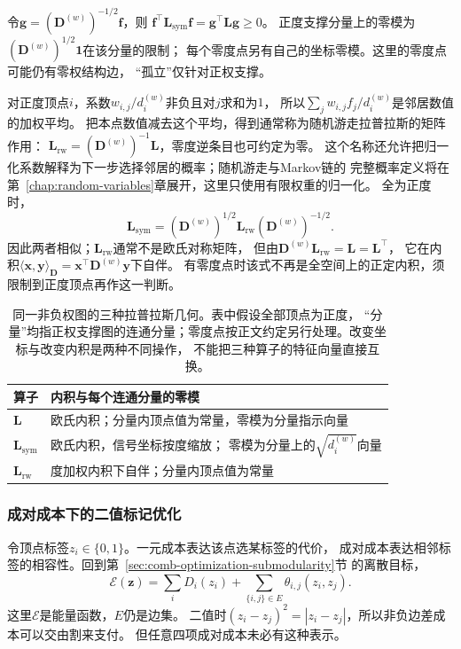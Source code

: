 令\(\bm g=(\bm D^{(w)})^{-1/2}\bm f\)，则
\(\bm f^\top\bm L_{\mathrm{sym}}\bm f=\bm g^\top\bm L\bm g\geq0\)。
正度支撑分量上的零模为\((\bm D^{(w)})^{1/2}\bm1\)在该分量的限制；
每个零度点另有自己的坐标零模。这里的零度点可能仍有零权结构边，
“孤立”仅针对正权支撑。

对正度顶点\(i\)，系数\(w_{i,j}/d_i^{(w)}\)非负且对\(j\)求和为\(1\)，
所以\(\sum_j w_{i,j}f_j/d_i^{(w)}\)是邻居数值的加权平均。
把本点数值减去这个平均，得到通常称为随机游走拉普拉斯的矩阵作用：
\(\bm L_{\mathrm{rw}}=(\bm D^{(w)})^{-1}\bm L\)，零度逆条目也可约定为零。
这个名称还允许把归一化系数解释为下一步选择邻居的概率；随机游走与Markov链的
完整概率定义将在第~\ref{chap:random-variables}章展开，这里只使用有限权重的归一化。
全为正度时，
\[
  \bm L_{\mathrm{sym}}
  =(\bm D^{(w)})^{1/2}\bm L_{\mathrm{rw}}(\bm D^{(w)})^{-1/2}.
\]
因此两者相似；\(\bm L_{\mathrm{rw}}\)通常不是欧氏对称矩阵，
但由\(\bm D^{(w)}\bm L_{\mathrm{rw}}=\bm L=\bm L^\top\)，
它在内积\(\langle\bm x,\bm y\rangle_{\bm D}
=\bm x^\top\bm D^{(w)}\bm y\)下自伴。
有零度点时该式不再是全空间上的正定内积，须限制到正度顶点再作这一判断。

\begin{table}[htbp]
  \centering\small
  \begin{tabularx}{\linewidth}{@{}lX@{}}
    \toprule
    算子 & 内积与每个连通分量的零模\\
    \midrule
    \(\bm L\) & 欧氏内积；分量内顶点值为常量，零模为分量指示向量\\
    \(\bm L_{\mathrm{sym}}\) & 欧氏内积，信号坐标按度缩放；
      零模为分量上的\(\sqrt{d_i^{(w)}}\)向量\\
    \(\bm L_{\mathrm{rw}}\) & 度加权内积下自伴；分量内顶点值为常量\\
    \bottomrule
  \end{tabularx}
  \caption{同一非负权图的三种拉普拉斯几何。表中假设全部顶点为正度，
  “分量”均指正权支撑图的连通分量；零度点按正文约定另行处理。改变坐标与改变内积是两种不同操作，
  不能把三种算子的特征向量直接互换。}
  \label{tab:graph-theory-laplacian-geometries}
\end{table}

\subsubsection{成对成本下的二值标记优化}

令顶点标签\(z_i\in\{0,1\}\)。一元成本表达该点选某标签的代价，
成对成本表达相邻标签的相容性。回到第~\ref{sec:comb-optimization-submodularity}节
的离散目标，
\begin{equation}
  \mathcal E(\bm z)=\sum_iD_i(z_i)
  +\sum_{\{i,j\}\in E}\theta_{i,j}(z_i,z_j).
  \label{eq:graph-theory-binary-pairwise-energy}
\end{equation}
这里\(\mathcal E\)是能量函数，\(E\)仍是边集。
二值时\((z_i-z_j)^2=|z_i-z_j|\)，所以非负边差成本可以交由割来支付。
但任意四项成对成本未必有这种表示。

